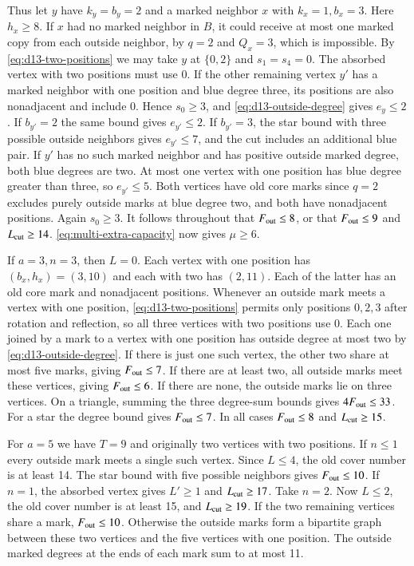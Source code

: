 Thus let $y$ have $k_y=b_y=2$ and a marked neighbor $x$ with
$k_x=1,b_x=3$. Here $h_x\ge8$. If $x$ had no marked neighbor in
$B$, it could receive at most one marked copy from each outside
neighbor, by $q=2$ and $Q_x=3$, which is impossible. By
\eqref{eq:d13-two-positions} we may take $y$ at $\{0,2\}$ and
$s_1=s_4=0$. The absorbed vertex with two positions must use 0.
If the other remaining vertex $y'$ has a marked neighbor with one
position and blue degree three, its positions are also nonadjacent
and include 0. Hence $s_0\ge3$, and \eqref{eq:d13-outside-degree}
gives $e_y\le2$. If $b_{y'}=2$ the same bound gives $e_{y'}\le2$.
If $b_{y'}=3$, the star bound with three possible outside neighbors
gives $e_{y'}\le7$, and the cut includes an additional blue pair.
If $y'$ has no such marked neighbor and has positive outside marked
degree, both blue degrees are two. At most one vertex with one position
has blue degree greater than three, so $e_{y'}\le5$. Both vertices
have old core marks since $q=2$ excludes purely outside marks at
blue degree two, and both have nonadjacent positions. Again $s_0\ge3$.
It follows throughout that $F_{\rm out}\le8$, or that
$F_{\rm out}\le9$ and $L_{\rm cut}\ge14$.
\eqref{eq:multi-extra-capacity} now gives $\mu\ge6$.

If $a=3,n=3$, then $L=0$. Each vertex with one position has
$(b_x,h_x)=(3,10)$ and each with two has $(2,11)$. Each of the
latter has an old core mark and nonadjacent positions.
Whenever an outside mark meets a vertex with one position,
\eqref{eq:d13-two-positions} permits only positions $0,2,3$ after
rotation and reflection, so all three vertices with two positions
use 0. Each one joined by a mark to a vertex with one position
has outside degree at most two by \eqref{eq:d13-outside-degree}.
If there is just one such vertex, the other two share at most five
marks, giving $F_{\rm out}\le7$. If there are at least two, all
outside marks meet these vertices, giving $F_{\rm out}\le6$. If
there are none, the outside marks lie on three vertices. On a triangle,
summing the three degree-sum bounds gives $4F_{\rm out}\le33$.
For a star the degree bound gives $F_{\rm out}\le7$. In all cases
$F_{\rm out}\le8$ and $L_{\rm cut}\ge15$.

For $a=5$ we have $T=9$ and originally two vertices with two
positions. If $n\le1$ every outside mark meets a single such vertex.
Since $L\le4$, the old cover number is at least 14. The star bound
with five possible neighbors gives $F_{\rm out}\le10$. If $n=1$,
the absorbed vertex gives $L'\ge1$ and $L_{\rm cut}\ge17$.
Take $n=2$. Now $L\le2$, the old cover number is at least 15,
and $L_{\rm cut}\ge19$. If the two remaining vertices share a mark,
$F_{\rm out}\le10$. Otherwise the outside marks form a bipartite
graph between these two vertices and the five vertices with one
position. The outside marked degrees at the ends of each mark sum
to at most 11.

